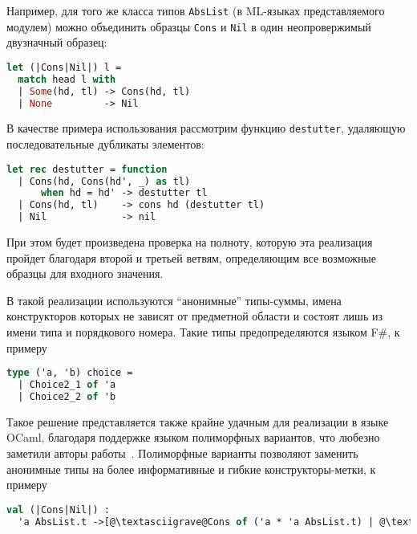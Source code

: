 Например, для того же класса типов \lstinline|AbsList| (в ML-языках представляемого модулем) можно объединить образцы \lstinline|Cons| и \lstinline|Nil| в один неопровержимый двузначный образец:

\noindent
\begin{minipage}{\linewidth}
\begin{lstlisting}[language=ocaml]
let (|Cons|Nil|) l =
  match head l with
  | Some(hd, tl) -> Cons(hd, tl)
  | None         -> Nil
\end{lstlisting}
\end{minipage}

В качестве примера использования рассмотрим функцию \lstinline|destutter|, удаляющую последовательные дубликаты элементов: 

\noindent
\begin{minipage}{\linewidth}
\begin{lstlisting}[language=ocaml]
let rec destutter = function
  | Cons(hd, Cons(hd', _) as tl) 
      when hd = hd' -> destutter tl
  | Cons(hd, tl)    -> cons hd (destutter tl)
  | Nil             -> nil
\end{lstlisting}
\end{minipage}

При этом будет произведена проверка на полноту, которую эта реализация пройдет благодаря второй и третьей ветвям, определяющим все возможные образцы для входного значения.

В такой реализации используются ``анонимные'' типы-суммы, имена конструкторов которых не зависят от предметной области и состоят лишь из имени типа и порядкового номера. Такие типы предопределяются языком F\#, к примеру

\noindent
\begin{minipage}{\linewidth}
\begin{lstlisting}[language=ocaml]
type ('a, 'b) choice =
  | Choice2_1 of 'a
  | Choice2_2 of 'b
\end{lstlisting}
\end{minipage}

Такое решение представляется также крайне удачным для реализации в языке OCaml, благодаря поддержке языком полиморфных вариантов, что любезно заметили авторы работы~\cite{syme2007extensible}. Полиморфные варианты позволяют заменить анонимные типы на более информативные и гибкие конструкторы-метки, к примеру

\noindent
\begin{minipage}{\linewidth}
\begin{lstlisting}[language=ocaml,escapechar=@]
val (|Cons|Nil|) : 
  'a AbsList.t ->[@\textasciigrave@Cons of ('a * 'a AbsList.t) | @\textasciigrave@Nil]
\end{lstlisting}
\end{minipage}

